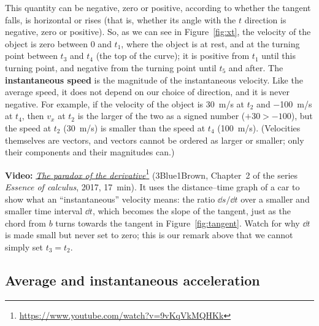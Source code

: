 \documentclass[11pt,a4paper]{article}
\begin{document}
This quantity can be negative, zero or positive, according to whether the tangent falls, is
horizontal or rises (that is, whether its angle with the $t$ direction is negative, zero or
positive). So, as we can see in Figure~\ref{fig:xt}, the velocity of the object is zero between
$0$ and $t_1$, where the object is at rest, and at the turning point between $t_3$ and $t_4$ (the
top of the curve); it is positive from $t_1$ until this turning point, and negative from the
turning point until $t_5$ and after. The \textbf{instantaneous speed} is the magnitude of the
instantaneous velocity. Like the average speed, it does not depend on our choice of direction, and
it is never negative. For example, if the velocity of the object is \qty{30}{m/s} at $t_2$ and
\qty{-100}{m/s} at $t_4$, then $v_x$ at $t_2$ is the larger of the two as a signed number
($+30 > -100$), but the speed at $t_2$ (\qty{30}{m/s}) is smaller than the speed at $t_4$
(\qty{100}{m/s}). (Velocities themselves are vectors, and vectors cannot be ordered as larger or
smaller; only their components and their magnitudes can.)

\begin{aside}
\textbf{Video:} \href{https://www.youtube.com/watch?v=9vKqVkMQHKk}{\emph{The paradox of the
derivative}}\footnote{\url{https://www.youtube.com/watch?v=9vKqVkMQHKk}} (3Blue1Brown, Chapter~2 of
the series \emph{Essence of calculus}, 2017, 17~min). It uses the distance--time graph of a car to
show what an ``instantaneous'' velocity means: the ratio $\dd s/\dd t$ over a smaller and smaller
time interval $\dd t$, which becomes the slope of the tangent, just as the chord from $b$ turns
towards the tangent in Figure~\ref{fig:tangent}. Watch for why $\dd t$ is made small but never set
to zero; this is our remark above that we cannot simply set $t_3 = t_2$.
\end{aside}

\subsection{Average and instantaneous acceleration}\label{sec:acceleration}
\end{document}
